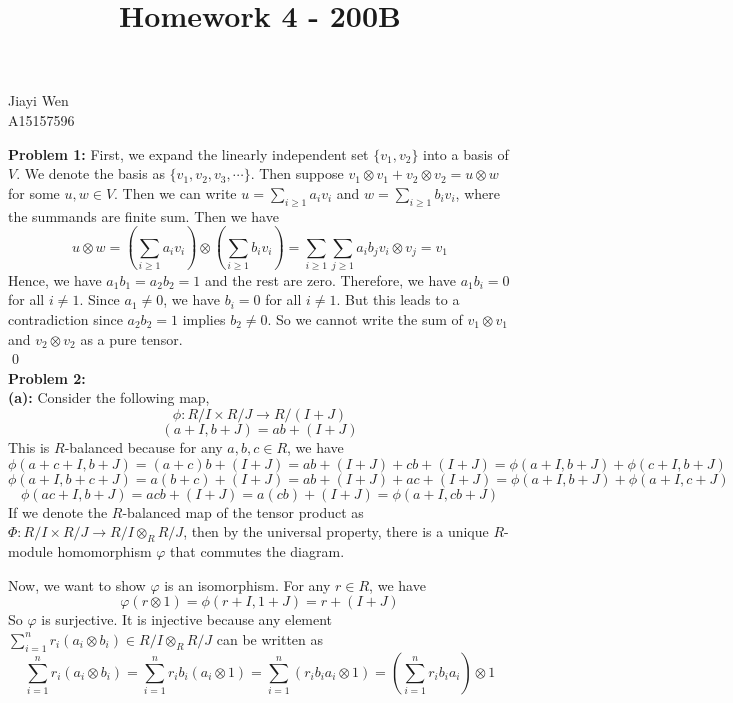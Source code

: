 \documentclass[12pt]{amsart}
\begin{document}
\title{Homework 4 - 200B}
\maketitle
\begin{center}
    Jiayi Wen\\
    A15157596
\end{center}
\textbf{Problem 1:} First, we expand the linearly independent set $\{v_1,v_2\}$ into a basis of $V$. We denote the basis as  $\{v_1,v_2,v_3,\cdots\}$. Then suppose $v_1\otimes v_1+v_2\otimes v_2=u\otimes w$ for some $u,w\in V$. Then we can write $u=\sum_{i\geq 1}a_iv_i$ and $w=\sum_{i\geq 1}b_iv_i$, where the summands are finite sum. Then we have
\[u\otimes w=(\sum_{i\geq 1}a_iv_i)\otimes (\sum_{i\geq 1}b_iv_i)=\sum_{i\geq 1}\sum_{j\geq 1}a_ib_jv_i\otimes v_j=v_1\]
Hence, we have $a_1b_1=a_2b_2=1$ and the rest are zero. Therefore, we have $a_1b_i=0$ for all $i\neq 1$. Since $a_1\neq 0$, we have $b_i=0$ for all $i\neq 1$. But this leads to a contradiction since $a_2b_2=1$ implies $b_2\neq 0$. So we cannot write the sum of $v_1\otimes v_1$ and $v_2\otimes v_2$ as a pure tensor.
\\\qed\\
\textbf{Problem 2:}
\\\textbf{(a):} Consider the following map,
\[\phi:R/I\times R/J\to R/(I+J)\]
\[(a+I,b+J)=ab+(I+J)\]
This is $R$-balanced because for any $a,b,c\in R$, we have
\[\phi(a+c+I,b+J)=(a+c)b+(I+J)=ab+(I+J)+cb+(I+J)=\phi(a+I,b+J)+\phi(c+I,b+J)\]
\[\phi(a+I,b+c+J)=a(b+c)+(I+J)=ab+(I+J)+ac+(I+J)=\phi(a+I,b+J)+\phi(a+I,c+J)\]
\[\phi(ac+I,b+J)=acb+(I+J)=a(cb)+(I+J)=\phi(a+I,cb+J)\]
If we denote the $R$-balanced map of the tensor product as $\Phi:R/I\times R/J\to R/I\otimes_R R/J$, then by the universal property, there is a unique $R$-module homomorphism $\varphi$ that commutes the diagram.
\begin{center}
\end{center}
Now, we want to show $\varphi$ is an isomorphism. For any $r\in R$, we have
\[\varphi(r\otimes 1)=\phi(r+I,1+J)=r+(I+J)\]
So $\varphi$ is surjective. It is injective because any element $\sum_{i=1}^nr_i(a_i\otimes b_i)\in R/I\otimes_R R/J$ can be written as
\[\sum_{i=1}^nr_i(a_i\otimes b_i)=\sum_{i=1}^nr_ib_i(a_i\otimes 1)=\sum_{i=1}^n(r_ib_ia_i\otimes 1)=(\sum_{i=1}^nr_ib_ia_i)\otimes 1\]
\end{document}
